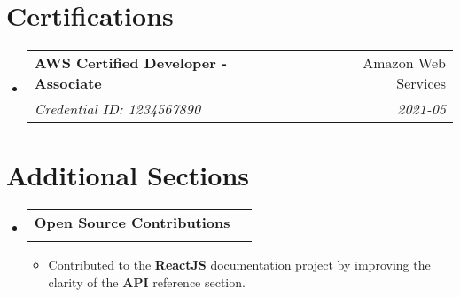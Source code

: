 \documentclass[letterpaper,11pt]{article}
\makeatletter
\newcommand{\resumeItem}[1]{
  \item\small{
    {#1 \vspace{-2pt}}
  }
}
\newcommand{\resumeSubheading}[4]{
  \vspace{-2pt}\item
    \begin{tabular*}{0.97\textwidth}[t]{l@{\extracolsep{\fill}}r}
      \textbf{#1} & #2 \\
      \textit{\small#3} & \textit{\small #4} \\
    \end{tabular*}\vspace{-7pt}
}
\newcommand{\resumeSubHeadingListStart}{\begin{itemize}[leftmargin=0.15in, label={}]}
\newcommand{\resumeSubHeadingListEnd}{\end{itemize}}
\newcommand{\resumeItemListStart}{\begin{itemize}}
\newcommand{\resumeItemListEnd}{\end{itemize}\vspace{-5pt}}
\makeatother
\begin{document}
\section{Certifications}
\resumeSubHeadingListStart
    \resumeSubheading
      {\textbf{AWS Certified Developer - Associate}}{Amazon Web Services}
      {Credential ID: 1234567890}{2021-05}
\resumeSubHeadingListEnd

\section{Additional Sections}
\resumeSubHeadingListStart
    \resumeSubheading
      {\textbf{Open Source Contributions}}{}
      {}{ }
      \resumeItemListStart
        \resumeItem{Contributed to the \textbf{ReactJS} documentation project by improving the clarity of the \textbf{API} reference section.}
      \resumeItemListEnd
\resumeSubHeadingListEnd
\end{document}
